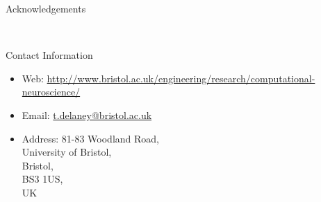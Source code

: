 \documentclass[final]{beamer}
\newlength{\sepwid}
\newlength{\onecolwid}
\begin{document}
\begin{frame}[t]
\begin{columns}[t]
\begin{column}{\onecolwid}
\begin{block}{Acknowledgements}

\small{} \\

\end{block}



\begin{alertblock}{Contact Information}

\begin{itemize}
\item Web: \href{http://www.bristol.ac.uk/engineering/research/computational-neuroscience/}{http://www.bristol.ac.uk/engineering/research/computational-neuroscience/}
\item Email: \href{mailto:t.delaney@bristol.ac.uk}{t.delaney@bristol.ac.uk}
\item Address: 	81-83 Woodland Road, \\
								\hspace{3.75cm} University of Bristol, \\
								\hspace{3.75cm} Bristol, \\
								\hspace{3.75cm} BS3 1US, \\
								\hspace{3.75cm} UK
\end{itemize}

\end{alertblock}

\end{column} %

\begin{column}{\sepwid}\end{column} %

\end{columns} %

\end{frame} %
\end{document}
